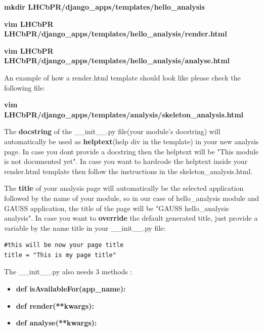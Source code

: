 \documentclass{lhcbnote}
\begin{document}
\vspace{2 mm}

{\bf mkdir LHCbPR/django\_apps/templates/hello\_analysis}

\vspace{2 mm}

{\bf vim LHCbPR LHCbPR/django\_apps/templates/hello\_analysis/render.html}

\vspace{2 mm}

{\bf vim LHCbPR LHCbPR/django\_apps/templates/hello\_analysis/analyse.html}
 \vspace{2 mm}

An example of how a render.html template should look like please check the following file:

\vspace{2 mm}

{\bf vim LHCbPR/django\_apps/templates/analysis/skeleton\_analysis.html}

\vspace{2 mm}

The {\bf docstring} of the \_\_init\_\_.py file(your module's docstring) will automatically be used as {\bf helptext}(help div in the template) in your new analysis page.
In case you dont provide a docstring then the helptext will be "This module is not documented yet". In case you want to hardcode the helptext inside your render.html template
then follow the instructions in the skeleton\_analysis.html.

The {\bf title} of your analysis page will automatically be the selected application followed by the name of your module, so in our case of hello\_analysis module and GAUSS application,
the title of the page will be "GAUSS hello\_analysis analysis". In case you want to {\bf override} the default generated title, just provide a variable by the name title in your \_\_init\_\_.py file:

\vspace{2 mm}

\begin{verbatim}
#this will be now your page title
title = "This is my page title"
\end{verbatim}

\vspace{2 mm}

The \_\_init\_\_.py also needs 3 methods :

\begin{itemize}
\item
{\bf def isAvailableFor(app\_name):}
\item
{\bf def render(**kwargs): }
\item
{\bf def analyse(**kwargs):}
\end{itemize}
\end{document}
